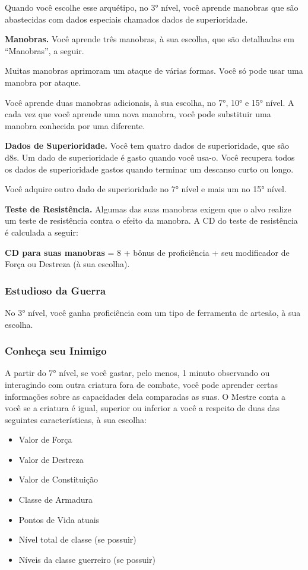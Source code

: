 \begin{multicols}{2}
Quando você escolhe esse arquétipo, no 3° nível, você aprende manobras que são
abastecidas com dados especiais chamados dados de superioridade.

\textbf{Manobras.} Você aprende três manobras, à sua escolha, que são detalhadas
em ``Manobras'', a seguir.

Muitas manobras aprimoram um ataque de várias formas.  Você só pode usar uma
manobra por ataque.

Você aprende duas manobras adicionais, à sua escolha, no 7°, 10° e 15° nível. A
cada vez que você aprende uma nova manobra, você pode substituir uma manobra
conhecida por uma diferente.

\textbf{Dados de Superioridade.} Você tem quatro dados de superioridade, que são
d8s. Um dado de superioridade é gasto quando você usa-o. Você recupera todos os
dados de superioridade gastos quando terminar um descanso curto ou longo.

Você adquire outro dado de superioridade no 7° nível e mais um no 15° nível.

\textbf{Teste de Resistência.} Algumas das suas manobras exigem que o alvo
realize um teste de resistência contra o efeito da manobra. A CD do teste de
resistência é calculada a seguir:
\begin{center}
\textbf{CD para suas manobras} = 8 + bônus de proficiência + seu modificador de
Força ou Destreza (à sua escolha).
\end{center}

\subsubsection{Estudioso da Guerra}%

No 3° nível, você ganha proficiência com um tipo de ferramenta de artesão, à sua
escolha.

\subsubsection{Conheça seu Inimigo}%

A partir do 7° nível, se você gastar, pelo menos, 1 minuto observando ou
interagindo com outra criatura fora de combate, você pode aprender certas
informações sobre as capacidades dela comparadas as suas. O Mestre conta a você
se a criatura é igual, superior ou inferior a você a respeito de duas das
seguintes características, à sua escolha:

\begin{itemize}
    \item Valor de Força
    \item Valor de Destreza
    \item Valor de Constituição
    \item Classe de Armadura
    \item Pontos de Vida atuais
    \item Nível total de classe (se possuir)
    \item Níveis da classe guerreiro (se possuir)
\end{itemize}


\end{multicols}
